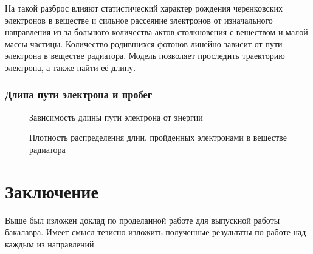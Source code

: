 \documentclass[12pt,a4paper]{report} %
\begin{document}
На такой разброс влияют статистический характер рождения черенковских электронов в веществе и сильное рассеяние электронов от изначального направления из-за большого количества актов столкновения с веществом и малой массы частицы. Количество родившихся фотонов линейно зависит от пути электрона в веществе радиатора. Модель позволяет проследить траекторию электрона, а также найти её длину.
\subsection{Длина пути электрона и пробег}
\begin{figure}[b]
\caption{Зависимость длины пути электрона от энергии}
\label{pic:length}
\caption{Плотность распределения длин, пройденных электронами в веществе радиатора}
\end{figure}

\chapter*{Заключение}
Выше был изложен доклад по проделанной работе для выпускной работы бакалавра. Имеет смысл тезисно изложить полученные результаты по работе над каждым из направлений.
\end{document}
